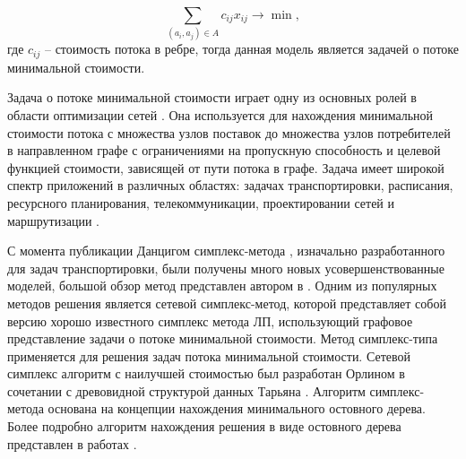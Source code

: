 \begin{equation}
    \label{eq:part2_1.5}
    \sum_{(a_i, a_j) \in A} c_{ij} x_{ij} \rightarrow \min ,
\end{equation}
где $c_{ij}$ -- стоимость потока в ребре, тогда данная модель является задачей о потоке минимальной стоимости. 

Задача о потоке минимальной стоимости играет одну из основных ролей в области оптимизации сетей \cite{Kovacs2015}. Она используется для нахождения минимальной стоимости потока с множества узлов поставок до множества узлов потребителей в направленном графе с ограничениями на пропускную способность и целевой функцией стоимости, зависящей от пути потока в графе. Задача имеет широкой спектр приложений в различных областях: задачах транспортировки, расписания, ресурсного планирования, телекоммуникации, проектировании сетей и маршрутизации \cite{Kovacs2015, Kiraly2012, Jiang2020}.  






С момента публикации Данцигом симплекс-метода \cite{Dantzig1963}, изначально разработанного для задач транспортировки, были получены много новых усовершенствованные моделей, большой обзор метод представлен автором в \cite{Kovacs2015}. Одним из популярных методов решения является сетевой симплекс-метод, которой представляет собой версию хорошо известного симплекс метода ЛП, использующий графовое представление задачи о потоке минимальной стоимости. Метод симплекс-типа применяется для решения задач потока минимальной стоимости. Сетевой симплекс алгоритм с наилучшей стоимостью был разработан Орлином \cite{Orlin1997} в сочетании с древовидной структурой данных Тарьяна \cite{Tarjan1997}. Алгоритм симплекс-метода основана на концепции нахождения минимального остовного дерева. Более подробно алгоритм нахождения решения в виде остовного дерева представлен в работах \cite{Kiraly2012, Kovacs2015, Holzhauser2017, Jiang2020}.

